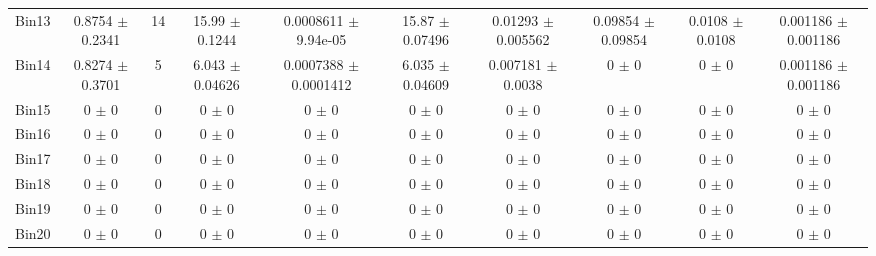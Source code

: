 \begin{tabular}{@{\extracolsep{4pt}}lccccccccc@{}}
     Bin13 & 0.8754 $\pm$ 0.2341 & 14 & 15.99 $\pm$ 0.1244 & 0.0008611 $\pm$ 9.94e-05 & 15.87 $\pm$ 0.07496 & 0.01293 $\pm$ 0.005562 & 0.09854 $\pm$ 0.09854 & 0.0108 $\pm$ 0.0108 & 0.001186 $\pm$ 0.001186 \\ 
     Bin14 & 0.8274 $\pm$ 0.3701 & 5 & 6.043 $\pm$ 0.04626 & 0.0007388 $\pm$ 0.0001412 & 6.035 $\pm$ 0.04609 & 0.007181 $\pm$ 0.0038 & 0 $\pm$ 0 & 0 $\pm$ 0 & 0.001186 $\pm$ 0.001186 \\ 
     Bin15 & 0 $\pm$ 0 & 0 & 0 $\pm$ 0 & 0 $\pm$ 0 & 0 $\pm$ 0 & 0 $\pm$ 0 & 0 $\pm$ 0 & 0 $\pm$ 0 & 0 $\pm$ 0 \\ 
     Bin16 & 0 $\pm$ 0 & 0 & 0 $\pm$ 0 & 0 $\pm$ 0 & 0 $\pm$ 0 & 0 $\pm$ 0 & 0 $\pm$ 0 & 0 $\pm$ 0 & 0 $\pm$ 0 \\ 
     Bin17 & 0 $\pm$ 0 & 0 & 0 $\pm$ 0 & 0 $\pm$ 0 & 0 $\pm$ 0 & 0 $\pm$ 0 & 0 $\pm$ 0 & 0 $\pm$ 0 & 0 $\pm$ 0 \\ 
     Bin18 & 0 $\pm$ 0 & 0 & 0 $\pm$ 0 & 0 $\pm$ 0 & 0 $\pm$ 0 & 0 $\pm$ 0 & 0 $\pm$ 0 & 0 $\pm$ 0 & 0 $\pm$ 0 \\ 
     Bin19 & 0 $\pm$ 0 & 0 & 0 $\pm$ 0 & 0 $\pm$ 0 & 0 $\pm$ 0 & 0 $\pm$ 0 & 0 $\pm$ 0 & 0 $\pm$ 0 & 0 $\pm$ 0 \\ 
     Bin20 & 0 $\pm$ 0 & 0 & 0 $\pm$ 0 & 0 $\pm$ 0 & 0 $\pm$ 0 & 0 $\pm$ 0 & 0 $\pm$ 0 & 0 $\pm$ 0 & 0 $\pm$ 0 \\ 
\hline\hline
  \end{tabular}
